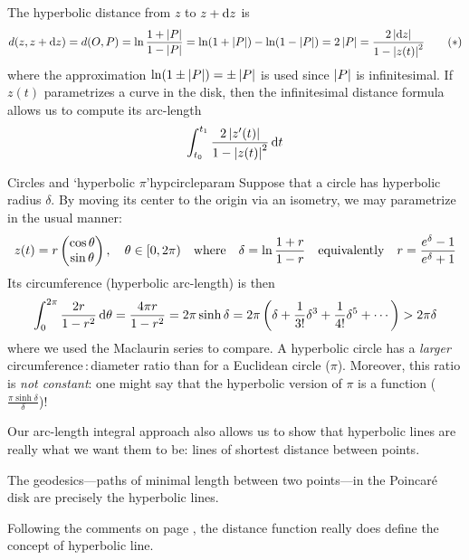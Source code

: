 
The hyperbolic distance from $z$ to $z+{\mathrm{d} z}$ is
\[
	d(z,z+{\mathrm{d} z})=d(O,P)=\ln\frac{1+\left| P\right|}{1-\left| P\right|} =\ln(1+\left| P\right|)-\ln(1-\left| P\right|)=2\left| P\right|=\frac{2\left| {\mathrm{d} z}\right|}{1-\left| z(t)\right|^2} \tag{$\ast$}
\]
where the approximation $\ln(1\pm\left| P\right|)=\pm\left| P\right|$ is used since $\left| P\right|$ is infinitesimal. If $z(t)$ parametrizes a curve in the disk, then the infinitesimal distance formula allows us to compute its arc-length
\[
	\int_{t_0}^{t_1}\frac{2\left| z'(t)\right|}{1-\left| z(t)\right|^2}\,{\mathrm{d} t}
\]

	
\begin{example}{Circles and `hyperbolic $\pi$'}{hypcircleparam}
	Suppose that a circle has hyperbolic radius $\delta$. By moving its center to the origin via an isometry, we may parametrize in the usual manner:
	\[
		z(t)=r\begin{pmatrix}\cos\theta\\\sin\theta\end{pmatrix},\quad \theta\in[0,2\pi)
		\quad\text{where}\quad 
		\delta=\ln\frac{1+r}{1-r}
		\quad\text{equivalently}\quad
		r=\frac{e^\delta-1}{e^\delta+1}
	\]
	Its circumference (hyperbolic arc-length) is then
	\[
		\int_0^{2\pi}\frac{2 r}{1-r^2}\,{\mathrm{d}\theta} =\frac{4\pi r}{1-r^2} =2\pi\sinh\delta =2\pi\left(\delta+\frac{1}{3!}\delta^3+\frac{1}{4!}\delta^5+\cdots\right)>2\pi\delta
	\]
	where we used the Maclaurin series to compare.\smallbreak
	A hyperbolic circle has a \emph{larger} circumference\,:\,diameter ratio than for a Euclidean circle ($\pi$). Moreover, this ratio is \emph{not constant}: one might say that the hyperbolic version of $\pi$ is a function ($\frac{\pi\sinh\delta}\delta$)!
\end{example}

\goodbreak
	
Our arc-length integral approach also allows us to show that hyperbolic lines are really what we want them to be: lines of shortest distance between points.
	
\begin{thm}{}{}
	The geodesics---paths of minimal length between two points---in the Poincaré disk are precisely the hyperbolic lines.
\end{thm}

Following the comments on page \pageref{sec:hyperiso}, the distance function really does define the concept of hyperbolic line.

